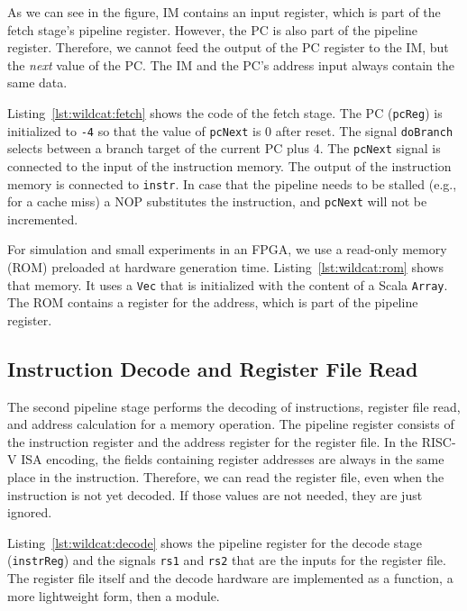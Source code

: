 \documentclass[%
    10pt,
    headinclude, footinclude=false,
    openright, %
    notitlepage,
    cleardoublepage=empty,
    headsepline,
    numbers=noenddot,
    bibliography=totoc, index=totoc,
    ]{scrbook}
\newcommand{\code}[1]{{\lstinline[basicstyle=\small\ttfamily]{#1}}}
\begin{document}
As we can see in the figure, IM contains an input register, which is part of the fetch
stage's pipeline register. However, the PC is also part of the pipeline
register. Therefore, we cannot feed the output of the PC register to the IM,
but the \emph{next} value of the PC. The IM and the PC's address input always
contain the same data.


Listing~\ref{lst:wildcat:fetch} shows the code of the fetch stage. The PC (\code{pcReg})
is initialized to \code{-4} so that the value of \code{pcNext} is 0 after reset.
The signal \code{doBranch} selects between a branch target of the current PC plus 4.
The \code{pcNext} signal is connected to the input of the instruction memory.
The output of the instruction memory is connected to \code{instr}.
In case that the pipeline needs to be stalled (e.g., for a cache miss)
a NOP substitutes the instruction, and \code{pcNext} will not be incremented.


For simulation and small experiments in an FPGA, we use a read-only memory (ROM)
preloaded at hardware generation time. Listing~\ref{lst:wildcat:rom} shows that memory.
It uses a \code{Vec} that is initialized with the content of a Scala \code{Array}.
The ROM contains a register for the address, which is part of the pipeline register.

\subsection{Instruction Decode and Register File Read}

The second pipeline stage performs the decoding of instructions, register file read, and address
calculation for a memory operation. The pipeline register consists of the instruction register
and the address register for the register file. In the RISC-V ISA encoding, the fields containing
register addresses are always in the same place in the instruction. Therefore, we can 
read the register file, even when the instruction is not yet decoded. If those values
are not needed, they are just ignored.

Listing~\ref{lst:wildcat:decode} shows the pipeline register for the decode stage (\code{instrReg}) and
the signals \code{rs1} and \code{rs2} that are the inputs for the register file.
The register file itself and the decode hardware are implemented as a function, a more lightweight
form, then a module.
\end{document}
